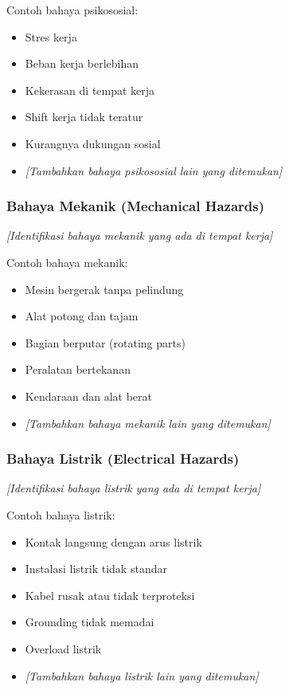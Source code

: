 Contoh bahaya psikososial:
\begin{itemize}
    \item Stres kerja
    \item Beban kerja berlebihan
    \item Kekerasan di tempat kerja
    \item Shift kerja tidak teratur
    \item Kurangnya dukungan sosial
    \item \textit{[Tambahkan bahaya psikososial lain yang ditemukan]}
\end{itemize}

\vspace{0.5cm}

\subsubsection{Bahaya Mekanik (Mechanical Hazards)}

\textit{[Identifikasi bahaya mekanik yang ada di tempat kerja]}

Contoh bahaya mekanik:
\begin{itemize}
    \item Mesin bergerak tanpa pelindung
    \item Alat potong dan tajam
    \item Bagian berputar (rotating parts)
    \item Peralatan bertekanan
    \item Kendaraan dan alat berat
    \item \textit{[Tambahkan bahaya mekanik lain yang ditemukan]}
\end{itemize}

\vspace{0.5cm}

\subsubsection{Bahaya Listrik (Electrical Hazards)}

\textit{[Identifikasi bahaya listrik yang ada di tempat kerja]}

Contoh bahaya listrik:
\begin{itemize}
    \item Kontak langsung dengan arus listrik
    \item Instalasi listrik tidak standar
    \item Kabel rusak atau tidak terproteksi
    \item Grounding tidak memadai
    \item Overload listrik
    \item \textit{[Tambahkan bahaya listrik lain yang ditemukan]}
\end{itemize}


